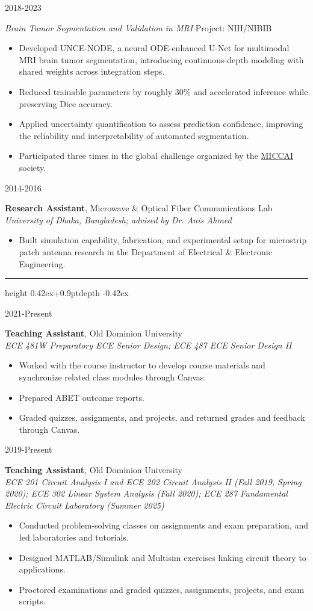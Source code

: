 \documentclass[11pt,letterpaper]{article}
\newcommand{\spaced}[1]{\lsstyle #1}
\newcommand{\cvsection}[1]{%
  \needspace{4\baselineskip}%
  \vspace{13pt}%
  \noindent{\large\scshape\spaced{#1}}\hspace{7pt}%
  {\leaders\hrule height \dimexpr0.42ex+0.9pt\relax depth -0.42ex\hfill}\kern0pt%
  \par\vspace{6pt}}
\newcommand{\entry}[2]{%
  \needspace{3\baselineskip}%
  \noindent\begin{minipage}[t]{0.155\textwidth}\raggedright\small #1\end{minipage}%
  \hspace{0.015\textwidth}%
  \begin{minipage}[t]{0.825\textwidth}#2\end{minipage}\par\vspace{7pt}}
\begin{document}
\entry{2018-2023}{\textit{Brain Tumor Segmentation and Validation in MRI} \quad Project: NIH/NIBIB
\begin{itemize}
\item Developed UNCE-NODE, a neural ODE-enhanced U-Net for multimodal MRI brain tumor segmentation, introducing continuous-depth modeling with shared weights across integration steps.
\item Reduced trainable parameters by roughly 30\% and accelerated inference while preserving Dice accuracy.
\item Applied uncertainty quantification to assess prediction confidence, improving the reliability and interpretability of automated segmentation.
\item Participated three times in the global challenge organized by the \href{https://www.synapse.org/Synapse:syn53708126/wiki/626320}{MICCAI} society.
\end{itemize}}

\entry{2014-2016}{\textbf{Research Assistant}, Microwave \& Optical Fiber Communications Lab\\
\textit{University of Dhaka, Bangladesh; advised by Dr. Anis Ahmed}
\begin{itemize}
\item Built simulation capability, fabrication, and experimental setup for microstrip patch antenna research in the Department of Electrical \& Electronic Engineering.
\end{itemize}}

\cvsection{Teaching Experience}

\entry{2021-Present}{\textbf{Teaching Assistant}, Old Dominion University\\
\textit{ECE 481W Preparatory ECE Senior Design; ECE 487 ECE Senior Design II}
\begin{itemize}
\item Worked with the course instructor to develop course materials and synchronize related class modules through Canvas.
\item Prepared ABET outcome reports.
\item Graded quizzes, assignments, and projects, and returned grades and feedback through Canvas.
\end{itemize}}

\entry{2019-Present}{\textbf{Teaching Assistant}, Old Dominion University\\
\textit{ECE 201 Circuit Analysis I and ECE 202 Circuit Analysis II (Fall 2019, Spring 2020); ECE 302 Linear System Analysis (Fall 2020); ECE 287 Fundamental Electric Circuit Laboratory (Summer 2025)}
\begin{itemize}
\item Conducted problem-solving classes on assignments and exam preparation, and led laboratories and tutorials.
\item Designed MATLAB/Simulink and Multisim exercises linking circuit theory to applications.
\item Proctored examinations and graded quizzes, assignments, projects, and exam scripts.
\end{itemize}}
\end{document}
